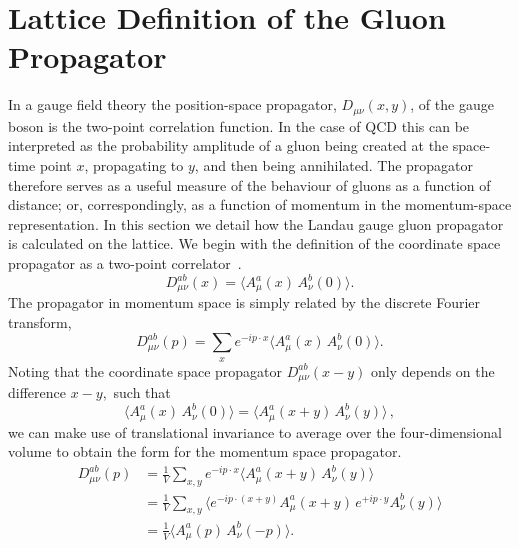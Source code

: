 \section{Lattice Definition of the Gluon Propagator}
In a gauge field theory the position-space propagator, $D_{\mu\nu}(x,y)$, of the gauge boson is the two-point correlation function. In the case of QCD this can be interpreted as the probability amplitude of a gluon being created at the space-time point $x$, propagating to $y$, and then being annihilated. The propagator therefore serves as a useful measure of the behaviour of gluons as a function of distance; or, correspondingly, as a function of momentum in the momentum-space representation. In this section we detail how the Landau gauge gluon propagator is calculated on the lattice. We begin with the definition of the coordinate space propagator as a two-point correlator~\cite{Zwanziger:1991gz,Cucchieri:1999sz,Langfeld:2001cz}.
\begin{equation}
D^{ab}_{\mu\nu}(x) = \langle A^a_\mu(x) \, A^b_\nu(0)\rangle.
\label{eq:coordGluonProp}
\end{equation}
The propagator in momentum space is simply related by the discrete Fourier transform,
\begin{equation}
D^{ab}_{\mu\nu}(p) = \sum_x e^{-ip\cdot x} \langle A^a_\mu(x) \, A^b_\nu(0) \rangle. 
\end{equation}
Noting that the coordinate space propagator $D^{ab}_{\mu\nu}(x-y)$ only depends on the difference $x-y,$ such that
\begin{equation}
\langle A^a_\mu(x) \, A^b_\nu(0)\rangle = \langle A^a_\mu(x+y) \, A^b_\nu(y)\rangle\, ,
\end{equation}
we can make use of translational invariance to average over the four-dimensional volume to obtain the form for the momentum space propagator.
\begin{align}
D^{ab}_{\mu\nu}(p) &= \frac{1}{V}\sum_{x,y} e^{-ip\cdot x}\langle A^a_\mu(x+y) \, A^b_\nu(y) \rangle \nonumber \\
                &= \frac{1}{V}\sum_{x,y} \langle e^{-ip\cdot (x+y)} A^a_\mu(x+y) \, e^{+ip\cdot y}A^b_\nu(y) \rangle \nonumber \\
                &= \frac{1}{V}\langle A^a_\mu(p) \, A^b_\nu(-p) \rangle. \label{eq:gluPropxtop}
\end{align}

